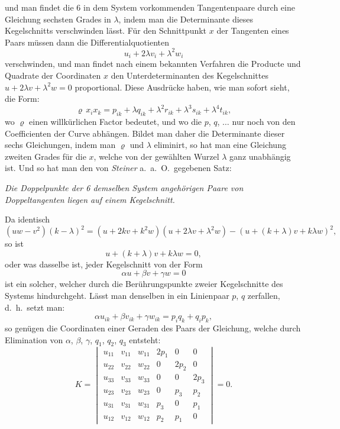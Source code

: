 \documentclass{article}
\begin{document}
und man findet die 6 in dem System vorkommenden Tangentenpaare durch eine Gleichung sechsten Grades in $\lambda$, indem man die Determinante dieses Kegelschnitts verschwinden lässt. Für den Schnittpunkt $x$ der Tangenten eines Paars müssen dann die Differentialquotienten
\[
u_{i} + 2\lambda v_{i} + \lambda^{2} w_{i}
\]
verschwinden, und man findet nach einem bekannten Verfahren die Producte und Quadrate der Coordinaten $x$ den Unterdeterminanten des Kegelschnittes $u+2\lambda v+\lambda^{2}w = 0$ proportional. Diese Ausdrücke haben, wie man sofort sieht, die Form:
\[
\varrho\, x_{i} x_{k} = p_{ik}+\lambda q_{ik}+\lambda^{2} r_{ik}+\lambda^{3} s_{ik}+\lambda^{4} t_{ik},
\]
wo $\varrho$ einen willkürlichen Factor bedeutet, und wo die $p$, $q$, $\ldots$ nur noch von den Coefficienten der Curve abhängen. Bildet man daher die Determinante dieser sechs Gleichungen, indem man $\varrho$ und $\lambda$ eliminirt, so hat man eine Gleichung zweiten Grades für die $x$, welche von der gewählten Wurzel $\lambda$ ganz unabhängig ist. Und so hat man den von \emph{Steiner} a.\ a.\ O.\ gegebenen Satz:

\emph{Die Doppelpunkte der 6 demselben System angehörigen Paare von Doppeltangenten liegen auf einem Kegelschnitt.}

Da identisch
\[
(uw-v^{2})(k-\lambda)^{2} = (u+2kv+k^{2}w)(u+2\lambda v+\lambda^{2}w)-(u+(k+\lambda)v+k\lambda w)^{2},
\]
so ist
\[
u+(k+\lambda)v+k\lambda w = 0,
\]
oder was dasselbe ist, jeder Kegelschnitt von der Form
\[
\alpha u+\beta v+\gamma w = 0
\]
ist ein solcher, welcher durch die Berührungspunkte zweier Kegelschnitte des Systems hindurchgeht. Lässt man denselben in ein Linienpaar $p$, $q$ zerfallen, d.\ h.\ setzt man:
\[
\alpha u_{ik}+\beta v_{ik}+\gamma w_{ik} = p_{i} q_{k}+q_{i} p_{k},
\]
so genügen die Coordinaten einer Geraden des Paars der Gleichung, welche durch Elimination von $\alpha$, $\beta$, $\gamma$, $q_{1}$, $q_{2}$, $q_{3}$ entsteht:
\[
K = \begin{vmatrix}
u_{11} & v_{11} & w_{11} & 2p_{1} & 0 & 0\\
u_{22} & v_{22} & w_{22} & 0 & 2p_{2} & 0\\
u_{33} & v_{33} & w_{33} & 0 & 0 & 2p_{3}\\
u_{23} & v_{23} & w_{23} & 0 & p_{3} & p_{2}\\
u_{31} & v_{31} & w_{31} & p_{3} & 0 & p_{1}\\
u_{12} & v_{12} & w_{12} & p_{2} & p_{1} & 0
\end{vmatrix} = 0.
\]
\end{document}
